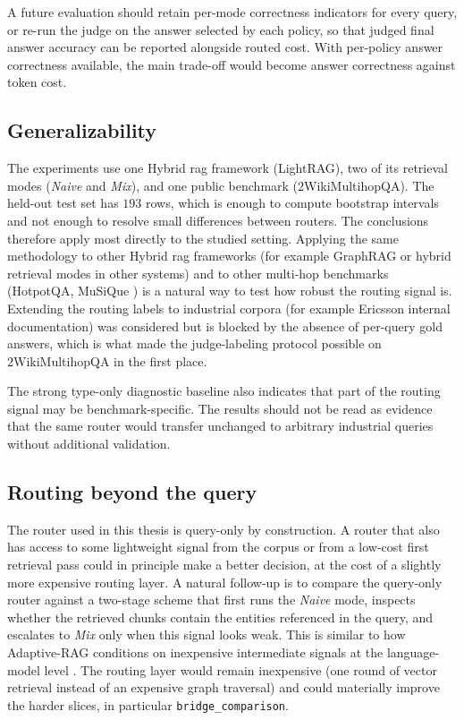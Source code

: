 \documentclass[english, bibtex]{kththesis}               %
\numberwithin{listing}{chapter}
\begin{document}
A future evaluation should retain per-mode correctness indicators for every query, or re-run the judge on the answer selected by each policy, so that judged final answer accuracy can be reported alongside routed cost. With per-policy answer correctness available, the main trade-off would become answer correctness against token cost.

\subsection{Generalizability}
\label{sec:limitGeneralizability}

The experiments use one Hybrid \gls{rag} framework (LightRAG), two of its retrieval modes (\emph{Naive} and \emph{Mix}), and one public benchmark (2WikiMultihopQA). The held-out test set has $193$ rows, which is enough to compute bootstrap intervals and not enough to resolve small differences between routers. The conclusions therefore apply most directly to the studied setting. Applying the same methodology to other Hybrid \gls{rag} frameworks (for example GraphRAG \cite{edge2024graphrag} or hybrid retrieval modes in other systems) and to other multi-hop benchmarks (HotpotQA, MuSiQue \cite{yang2018hotpotqa,trivedi2022musique}) is a natural way to test how robust the routing signal is. Extending the routing labels to industrial corpora (for example Ericsson internal documentation) was considered but is blocked by the absence of per-query gold answers, which is what made the judge-labeling protocol possible on 2WikiMultihopQA in the first place.

The strong type-only diagnostic baseline also indicates that part of the routing signal may be benchmark-specific. The results should not be read as evidence that the same router would transfer unchanged to arbitrary industrial queries without additional validation.

\subsection{Routing beyond the query}
\label{sec:limitRouting}

The router used in this thesis is query-only by construction. A router that also has access to some lightweight signal from the corpus or from a low-cost first retrieval pass could in principle make a better decision, at the cost of a slightly more expensive routing layer. A natural follow-up is to compare the query-only router against a two-stage scheme that first runs the \emph{Naive} mode, inspects whether the retrieved chunks contain the entities referenced in the query, and escalates to \emph{Mix} only when this signal looks weak. This is similar to how Adaptive-RAG conditions on inexpensive intermediate signals at the language-model level \cite{jeong2024adaptiverag}. The routing layer would remain inexpensive (one round of vector retrieval instead of an expensive graph traversal) and could materially improve the harder slices, in particular \texttt{bridge\_comparison}.
\end{document}
